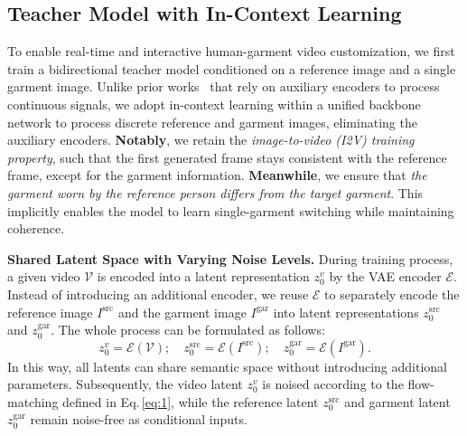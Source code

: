\subsection{Teacher Model with In-Context Learning}
\label{sec:3-1}
% 
To enable real-time and interactive human-garment video customization, we first train a bidirectional teacher model conditioned on a reference image and a single garment image.
% 
Unlike prior works~\cite{huang2025live,zhuang2025flashvsr,shin2025motionstream} that rely on auxiliary encoders to process continuous signals, we adopt in-context learning within a unified backbone network to process discrete reference and garment images, eliminating the auxiliary encoders.
% 
\textbf{Notably}, we retain the \textit{image-to-video (I2V) training property}, such that the first generated frame stays consistent with the reference frame, except for the garment information.
\textbf{Meanwhile}, we ensure that \textit{the garment worn by the reference person differs from the target garment}.
This implicitly enables the model to learn single-garment switching while maintaining coherence.

\noindent
\textbf{Shared Latent Space with Varying Noise Levels.}
% 
During training process, a given video $\mathcal{V}$ is encoded into a latent representation $z_{0}^{v}$ by the VAE encoder $\mathcal{E}$.
% 
Instead of introducing an additional encoder, we reuse $\mathcal{E}$ to separately encode the reference image $I^{\text{src}}$ and the garment image $I^{\text{gar}}$ into latent representations $z^{\text{src}}_{0}$ and $z^{\text{gar}}_{0}$.
% 
The whole process can be formulated as follows:
% 
\begin{equation}
    z^{v}_{0} = \mathcal{E}(\mathcal{V});\quad
    z^{\text{src}}_{0} = \mathcal{E}(I^{\text{src}});\quad
    z^{\text{gar}}_{0} = \mathcal{E}(I^{\text{gar}}).
\end{equation}
% 
In this way, all latents can share semantic space without introducing additional parameters.
% 
Subsequently, the video latent $z_{0}^{v}$ is noised according to the flow-matching defined in Eq.\,\ref{eq:1}, while the reference latent $z^{\text{src}}_{0}$ and garment latent $z^{\text{gar}}_{0}$ remain noise-free as conditional inputs.



